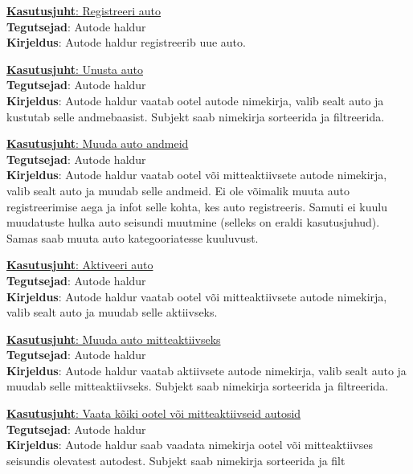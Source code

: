 \begin{flushleft}
\underline{\textbf{Kasutusjuht}: Registreeri auto} \\
\textbf{Tegutsejad}: Autode haldur \\
\textbf{Kirjeldus}: Autode haldur registreerib uue auto. 
\end{flushleft}

\begin{flushleft}
	\underline{\textbf{Kasutusjuht}: Unusta auto} \\
	\textbf{Tegutsejad}: Autode haldur \\
	\textbf{Kirjeldus}: Autode haldur vaatab ootel autode nimekirja, valib sealt auto ja kustutab selle andmebaasist. Subjekt saab nimekirja sorteerida ja filtreerida. 
\end{flushleft}

\begin{flushleft}
	\underline{\textbf{Kasutusjuht}: Muuda auto andmeid} \\
	\textbf{Tegutsejad}: Autode haldur \\
	\textbf{Kirjeldus}: Autode haldur vaatab ootel  või mitteaktiivsete autode nimekirja, valib sealt auto ja muudab selle andmeid. Ei ole võimalik muuta auto registreerimise aega ja infot selle kohta, kes auto registreeris. Samuti ei kuulu muudatuste hulka auto seisundi muutmine (selleks on eraldi kasutusjuhud). Samas saab muuta auto kategooriatesse kuuluvust. 
\end{flushleft}

\begin{flushleft}
	\underline{\textbf{Kasutusjuht}: Aktiveeri auto} \\
	\textbf{Tegutsejad}: Autode haldur \\
	\textbf{Kirjeldus}: Autode haldur vaatab ootel või mitteaktiivsete autode nimekirja, valib sealt auto ja muudab selle aktiivseks.  
\end{flushleft}

\begin{flushleft}
	\underline{\textbf{Kasutusjuht}: Muuda auto mitteaktiivseks} \\
	\textbf{Tegutsejad}: Autode haldur \\
	\textbf{Kirjeldus}: Autode haldur vaatab aktiivsete autode nimekirja, valib sealt auto ja muudab selle mitteaktiivseks. Subjekt saab nimekirja sorteerida ja filtreerida. 
\end{flushleft}

\begin{flushleft}
	\underline{\textbf{Kasutusjuht}: Vaata kõiki ootel või mitteaktiivseid autosid} \\
	\textbf{Tegutsejad}: Autode haldur \\
	\textbf{Kirjeldus}: Autode haldur saab vaadata nimekirja ootel või mitteaktiivses seisundis olevatest autodest. Subjekt saab nimekirja sorteerida ja filt 
\end{flushleft}


